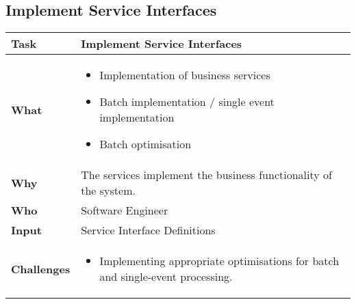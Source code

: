 \subsection{Implement Service Interfaces}
\begin{minipage}{\textwidth}
 \label{table:ch6_Task_Implement_Service_Interfaces}
\begin{tabular}
	{|m{3cm}|m{10cm}|} \hline \bfseries Task & Implement Service Interfaces\\
	\hline \bfseries What & 
	\begin{itemize}
		\item Implementation of business services
		\item Batch implementation / single event implementation
		\item Batch optimisation
	\end{itemize}
	\\
	\hline \bfseries Why & The services implement the business functionality of the system.\\
	\hline \bfseries Who & Software Engineer\\
	\hline \bfseries Input & Service Interface Definitions\\
	\hline \bfseries Challenges & 
	\begin{itemize}
		\item Implementing appropriate optimisations for batch and single-event processing.
	\end{itemize}
	\\
	\hline 
\end{tabular}
\end{minipage}

